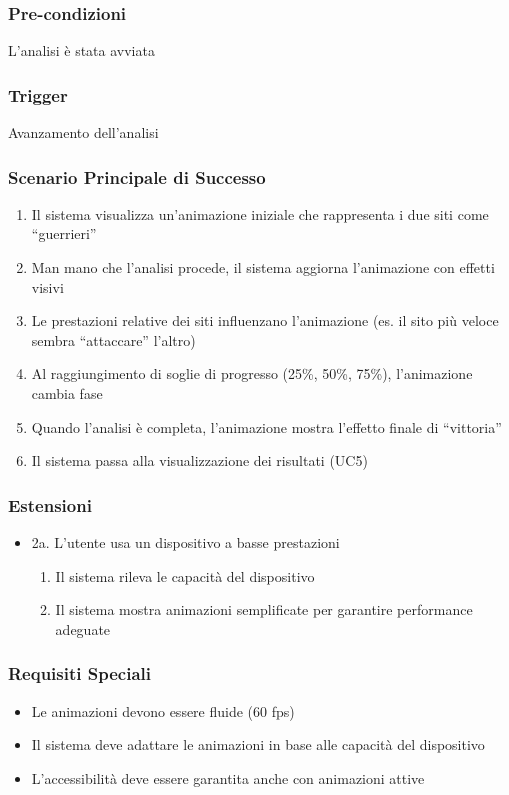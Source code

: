 \subsubsection{Pre-condizioni}
L'analisi è stata avviata

\subsubsection{Trigger}
Avanzamento dell'analisi

\subsubsection{Scenario Principale di Successo}
\begin{enumerate}
    \item Il sistema visualizza un'animazione iniziale che rappresenta i due siti come ``guerrieri''
    \item Man mano che l'analisi procede, il sistema aggiorna l'animazione con effetti visivi
    \item Le prestazioni relative dei siti influenzano l'animazione (es. il sito più veloce sembra ``attaccare'' l'altro)
    \item Al raggiungimento di soglie di progresso (25\%, 50\%, 75\%), l'animazione cambia fase
    \item Quando l'analisi è completa, l'animazione mostra l'effetto finale di ``vittoria''
    \item Il sistema passa alla visualizzazione dei risultati (UC5)
\end{enumerate}

\subsubsection{Estensioni}
\begin{itemize}
    \item 2a. L'utente usa un dispositivo a basse prestazioni
    \begin{enumerate}
        \item Il sistema rileva le capacità del dispositivo
        \item Il sistema mostra animazioni semplificate per garantire performance adeguate
    \end{enumerate}
\end{itemize}

\subsubsection{Requisiti Speciali}
\begin{itemize}
    \item Le animazioni devono essere fluide (60 fps)
    \item Il sistema deve adattare le animazioni in base alle capacità del dispositivo
    \item L'accessibilità deve essere garantita anche con animazioni attive
\end{itemize}

